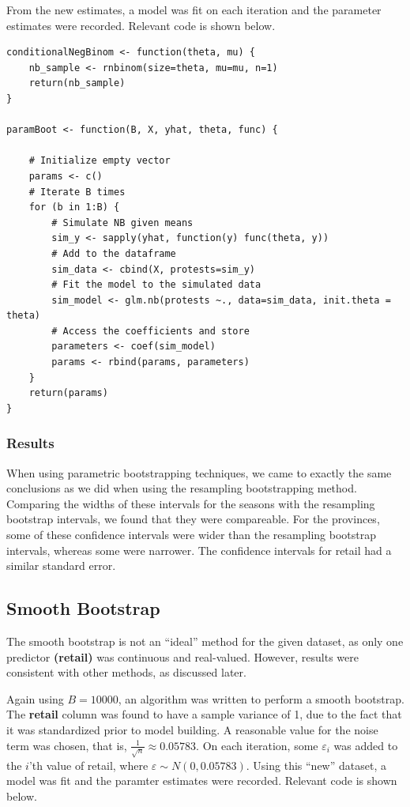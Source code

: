 \documentclass[12pt]{article}
\begin{document}
From the new estimates, a model was fit on each iteration and the parameter estimates were recorded. Relevant code is shown below.

\begin{lstlisting}
conditionalNegBinom <- function(theta, mu) {
    nb_sample <- rnbinom(size=theta, mu=mu, n=1)
    return(nb_sample)
}

paramBoot <- function(B, X, yhat, theta, func) {

    # Initialize empty vector
    params <- c()
    # Iterate B times
    for (b in 1:B) {
        # Simulate NB given means
        sim_y <- sapply(yhat, function(y) func(theta, y))
        # Add to the dataframe
        sim_data <- cbind(X, protests=sim_y)
        # Fit the model to the simulated data
        sim_model <- glm.nb(protests ~., data=sim_data, init.theta = theta)
        # Access the coefficients and store
        parameters <- coef(sim_model)
        params <- rbind(params, parameters)
    }
    return(params)
}
\end{lstlisting}
\subsubsection*{Results}
When using parametric bootstrapping techniques, we came to exactly the same conclusions as we did when using the resampling bootstrapping method. Comparing the widths of these intervals for the seasons with the resampling bootstrap intervals, we found that they were compareable. For the provinces, some of these confidence intervals were wider than the resampling bootstrap intervals, whereas some were narrower. The confidence intervals for retail had a similar standard error.



\subsection{Smooth Bootstrap}
The smooth bootstrap is not an ``ideal'' method for the given dataset, as only one predictor \textbf{(retail)} was continuous and real-valued. However, results were consistent with other methods, as discussed later.

Again using $B = 10000$, an algorithm was written to perform a smooth bootstrap. The \textbf{retail} column was found to have a sample variance of 1, due to the fact that it was standardized prior to model building. A reasonable value for the noise term was chosen, that is, $\frac{1}{\sqrt{n}} \approx 0.05783$. On each iteration, some $\varepsilon_i$ was added to the $i$'th value of retail, where $\varepsilon \sim N(0, 0.05783)$. Using this ``new'' dataset, a model was fit and the paramter estimates were recorded. Relevant code is shown below.
\end{document}
